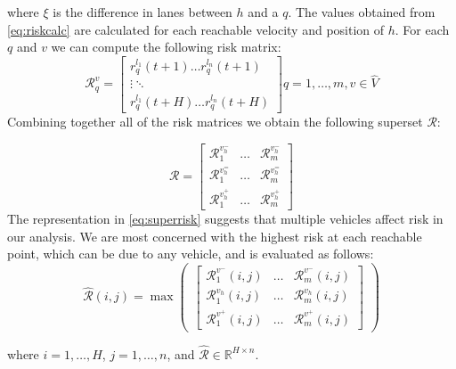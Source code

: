 \documentclass[letterpaper, 10 pt, conference]{ieeeconf}  %
\newcommand\NB[1]{$\spadesuit$\footnote{NB: #1}}
\begin{document}
where $\xi$ is the difference in lanes between $h$ and a $q$.
 The values obtained from \eqref{eq:riskcalc} are calculated for each reachable velocity and position of $h$. For each $q$ and $v$ we can compute the following risk matrix: %
\begin{equation} \label{eq:riskmat}
\mathcal{R}_{q}^{v}=
\begin{bmatrix}
r_q^{l_1}(t+1)  \dots  r_q^{l_n}(t+1) \\
\vdots  \ddots  \\
r_q^{l_1}(t+H)  \dots   r_q^{l_n}(t+H)
\end{bmatrix} q = 1,\ldots,m,v\in\hat{V}
\end{equation}
Combining together all of the risk matrices we obtain the following superset $\mathcal{R}$:

\begin{equation} \label{eq:superrisk}
\mathcal{R} =
\begin{bmatrix}
\mathcal{R}_{1}^{v_h^-} & \ldots & \mathcal{R}_{m}^{v_h^-} \\
\mathcal{R}_{1}^{v_h^=} & \ldots & \mathcal{R}_{m}^{v_h^=} \\
\mathcal{R}_{1}^{v_h^+} & \ldots   & \mathcal{R}_{m}^{v_h^+}
\end{bmatrix}
\end{equation}
The representation in \eqref{eq:superrisk} suggests that multiple vehicles affect risk in our analysis. We are most concerned with the highest risk at each reachable point, which can be due to any vehicle, and is evaluated as follows: %
\begin{equation} \label{eq:riskdistribution}
 \hat{\mathcal{R}}(i,j) = \max\begin{pmatrix}
 \begin{bmatrix}
\mathcal{R}_{1}^{v^-}(i,j) & \ldots & \mathcal{R}_{m}^{v^-}(i,j) \\
\mathcal{R}_{1}^{v_h}(i,j) & \ldots & \mathcal{R}_{m}^{v_h}(i,j) \\
\mathcal{R}_{1}^{v^+}(i,j) & \ldots   & \mathcal{R}_{m}^{v^+}(i,j)
\end{bmatrix}\end{pmatrix}
\end{equation}

 where $i = 1,\ldots,H$, $j = 1,\ldots,n$, and $\hat{\mathcal{R}} \in \mathbb{R}^{H\times n}$.
 
\end{document}
